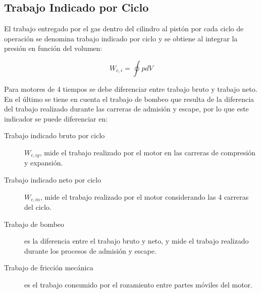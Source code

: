 


\subsection{Trabajo Indicado por Ciclo}
%
El trabajo entregado por el gas dentro del cilindro al pistón por cada ciclo de
operación se denomina trabajo indicado por ciclo y se obtiene al integrar la
presión en función del volumen:

\begin{equation}\label{eq:w_indicado}
  W_{c,i} = \oint p dV
\end{equation}

Para motores de 4 tiempos se debe diferenciar entre trabajo bruto y trabajo neto.
%
En el último se tiene en cuenta el trabajo de bombeo que resulta de la
diferencia del trabajo realizado durante las carreras de admisión y escape, por
lo que este indicador se puede diferenciar en:
%
\begin{description}
  \item [Trabajo indicado bruto por ciclo] $W_{c,ig}$, mide el trabajo realizado
por el motor en las carreras de compresión y expansión.
  \item [Trabajo indicado neto por ciclo] $W_{c,in}$, mide el trabajo realizado
por el motor considerando las 4 carreras del ciclo.
  \item [Trabajo de bombeo] es la diferencia entre el trabajo bruto y neto, y
mide el trabajo realizado durante los procesos de admisión y escape.
  \item [Trabajo de fricción mecánica] es el trabajo consumido por el rozamiento
entre partes móviles del motor.
\end{description}



